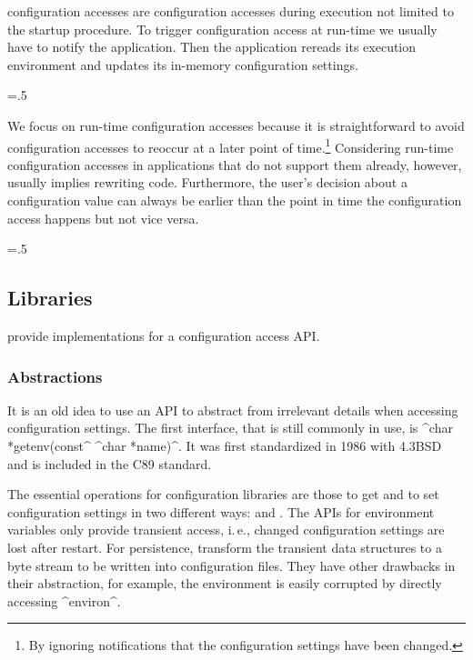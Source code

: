 \begin{itemize}
\begin{description}[font=\textintro]
\item[Run-time] configuration accesses 
are configuration accesses during execution not limited to the startup procedure.
To trigger configuration access at run-time we usually have to notify the application.
Then the application rereads its execution environment and updates its in-memory configuration settings.%
{\parfillskip=0pt \emergencystretch=.5\textwidth \par}
\end{description}
\end{itemize}

We focus on run-time configuration accesses because it is straightforward to avoid configuration accesses to reoccur at a later point of time.\footnote{By ignoring notifications that the configuration settings have been changed.}
Considering run-time configuration accesses in applications that do not support them already, however, usually implies rewriting code.
Furthermore, the user's decision about a configuration value can always be earlier than the point in time the configuration access happens but not vice versa.%
{\parfillskip=0pt \emergencystretch=.5\textwidth \par}




\subsection{Libraries}

 provide implementations for a configuration access API.

\subsubsection{Abstractions}

It is an old idea to use an API to abstract from irrelevant details when accessing configuration settings.
The first interface, that is still commonly in use, is ^char *getenv(const^ ^char *name)^.
It was first standardized in 1986 with 4.3BSD and is included in the C89 standard.

The essential operations for configuration libraries are those to get and to set configuration settings in two different ways:  and .
The APIs for environment variables only provide transient access, i.\,e., changed configuration settings are lost after restart.
For persistence,  transform the transient data structures to a byte stream to be written into configuration files.
They have other drawbacks in their abstraction, for example, the environment is easily corrupted by directly accessing ^environ^.

